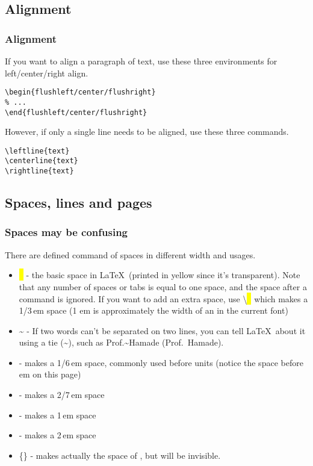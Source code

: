 \subsection{Alignment}

\begin{frame}[fragile]
	\frametitle{Alignment}
	If you want to align a paragraph of text, use these three environments for left/center/right align.
	\begin{command}
			\begin{verbatim}
\begin{flushleft/center/flushright}
% ...
\end{flushleft/center/flushright}
			\end{verbatim}
	\end{command}
	However, if only a single line needs to be aligned, use these three commands.
	\begin{command}
		\begin{verbatim}
\leftline{text}
\centerline{text}
\rightline{text}
		\end{verbatim}
	\end{command}
\end{frame}

\subsection{Spaces, lines and pages}

\begin{frame}
	\frametitle{Spaces may be confusing}
	There are defined command of spaces in different width and usages.
	\begin{itemize}
		\item \colorbox{yellow}{\ } - the basic space in \LaTeX\ (printed in yellow since it's transparent). Note that any number of spaces or tabs is equal to one space, and the space after a command is ignored. If you want to add an extra space, use \alert{\textbackslash}\colorbox{yellow}{\ } which makes a 1/3\,em space (1 em is approximately the width of an  in the current font)
		\item \~{} - If two words can't be separated on two lines, you can tell \LaTeX\ about it using a tie (\~{}), such as Prof.\~{}Hamade (Prof.~Hamade).
		\item  \samplecommand{,} - makes a 1/6\,em space, commonly used before units (notice the space before em on this page)
		\item  \samplecommand{;} - makes a 2/7\,em space
		\item  {} - makes a 1\,em space
		\item  {} - makes a 2\,em space
		\item  {}\{\} - makes actually the space of , but  will be invisible.
	\end{itemize}
\end{frame}

